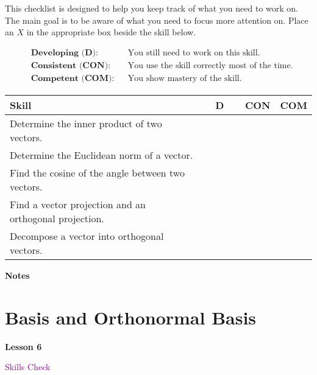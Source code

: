 \documentclass[10pt]{book}
\theoremstyle{definition}
\theoremstyle{remark}
\begin{document}
\begin{large}
\noindent
This checklist is designed to help you keep track of what you need to work on. The main goal is to be aware of what you need to focus more attention on. Place an $X$ in the appropriate box beside the skill below. 
\bigskip

\noindent
\begin{align*}
&\textbf{Developing (D):} &&\textrm{You still need to work on this skill.}\\
&\textbf{Consistent (CON):} &&\textrm{You use the skill correctly most of the time.}\\
&\textbf{Competent (COM):} &&\textrm{You show mastery of the skill.} 
\end{align*}
\vfil

\begin{center}
\begin{tabular}{|l|l|l|l|}
\hline
\textbf{Skill} & \textbf{~~D~~} & \textbf{CON} & \textbf{COM} \\
\hline
Determine the inner product of two vectors.&&&\\
\hline
Determine the Euclidean norm of a vector.&&&\\
\hline
Find the cosine of the angle between two vectors.&&&\\
\hline
Find a vector projection and an orthogonal projection.&&&\\
\hline
Decompose a vector into orthogonal vectors.&&&\\
\hline
\end{tabular}
\end{center}
 \vfil

\noindent
\textbf{Notes}
\end{large} \vfil
\newpage


\section{Basis and Orthonormal Basis}
\begin{tcolorbox}[
  width=\textwidth,
  colback=gray!10, %
  colframe=white, %
  boxrule=0pt,    %
  left=1cm,       %
  right=1cm,      %
  sharp corners  %
]

\begin{minipage}[t]{0.5\textwidth}
  \Huge \textbf{Lesson 6}
\end{minipage}%
\hfill
\begin{minipage}[t]{0.5\textwidth}
  \Huge \textcolor{purple}{Skills Check}
\end{minipage}
\end{tcolorbox}
\end{document}
